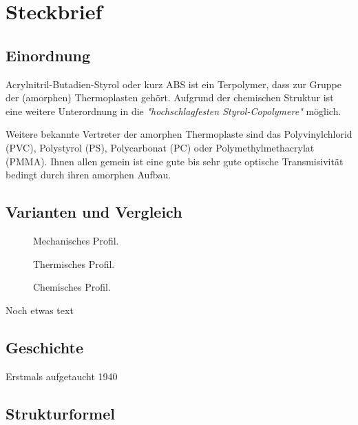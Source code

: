 \chapter{Steckbrief}
\section{Einordnung}
    Acrylnitril-Butadien-Styrol oder kurz ABS ist ein Terpolymer, dass zur Gruppe der (amorphen) Thermoplasten gehört. Aufgrund
    der chemischen Struktur ist eine weitere Unterordnung in die \textit{"hochschlagfesten Styrol-Copolymere"}\cite{Eyerer.2020.Polymer.Engineering.1}
    möglich.\par
    Weitere bekannte Vertreter der amorphen Thermoplaste sind das Polyvinylchlorid (PVC), Polystyrol (PS), Polycarbonat (PC)
    oder Polymethylmethacrylat (PMMA). Ihnen allen gemein ist eine gute bis sehr gute optische Transmisivität bedingt durch ihren amorphen Aufbau.
\section{Varianten und Vergleich}
    
    \begin{figure}[H]
        \centering
        
        \caption{Mechanisches Profil.}
        \label{fig:pc mechanical profile}
    \end{figure}
    \begin{figure}[H]
        \centering
        
        \caption{Thermisches Profil.}
        \label{fig:pc thermal profile}
    \end{figure}
    \begin{figure}[H]
        \centering
        
        \caption{Chemisches Profil.}
        \label{fig:pc chemical profile}
    \end{figure}
    Noch etwas text

\section{Geschichte}
    Erstmals aufgetaucht 1940 \cite{PlasticsInsight.20201005}
\section{Strukturformel}
